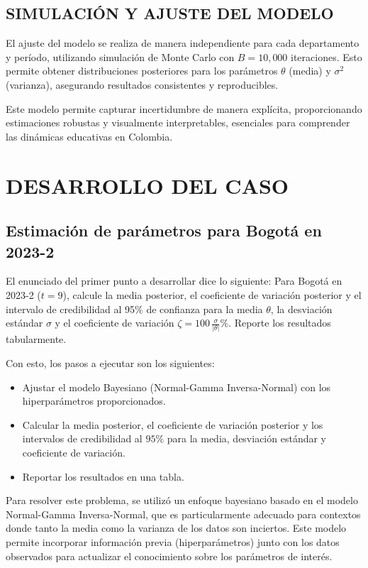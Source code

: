 \documentclass[12pt]{article}
\begin{document}
\subsection{SIMULACIÓN Y AJUSTE DEL MODELO}

El ajuste del modelo se realiza de manera independiente para cada departamento y período, utilizando simulación de Monte Carlo con $B = 10,000$ iteraciones. Esto permite obtener distribuciones posteriores para los parámetros $\theta$ (media) y $\sigma^2$ (varianza), asegurando resultados consistentes y reproducibles.  

Este modelo permite capturar incertidumbre de manera explícita, proporcionando estimaciones robustas y visualmente interpretables, esenciales para comprender las dinámicas educativas en Colombia.  


\section{DESARROLLO DEL CASO}

\subsection{Estimación de parámetros para Bogotá en 2023-2}

El enunciado del primer punto a desarrollar dice lo siguiente: Para Bogotá en 2023-2 ($t=9$), calcule la media posterior, el coeficiente de variación posterior y el intervalo de credibilidad al 95$\%$ de confianza para la media $\theta$, la desviación estándar $\sigma$ y el coeficiente de variación $\zeta=100\,\frac{\sigma}{|\theta|}\%$. Reporte los resultados tabularmente.

Con esto, los pasos a ejecutar son los siguientes:

\begin{itemize}
    \item Ajustar el modelo Bayesiano (Normal-Gamma Inversa-Normal) con los hiperparámetros proporcionados.
    \item Calcular la media posterior, el coeficiente de variación posterior y los intervalos de credibilidad al $95\%$ para la media, desviación estándar y coeficiente de variación.
    \item Reportar los resultados en una tabla.
\end{itemize}

Para resolver este problema, se utilizó un enfoque bayesiano basado en el modelo Normal-Gamma Inversa-Normal, que es particularmente adecuado para contextos donde tanto la media como la varianza de los datos son inciertos. Este modelo permite incorporar información previa (hiperparámetros) junto con los datos observados para actualizar el conocimiento sobre los parámetros de interés.
\end{document}
